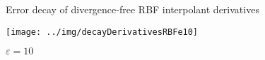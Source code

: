\documentclass{beamer}
\begin{document}
\begin{frame}{Error decay of divergence-free RBF interpolant derivatives}
  \begin{center}
    \texttt{[image: ../img/decayDerivativesRBFe10]}
    
    $\varepsilon = 10$
  \end{center}
\end{frame}
\end{document}
